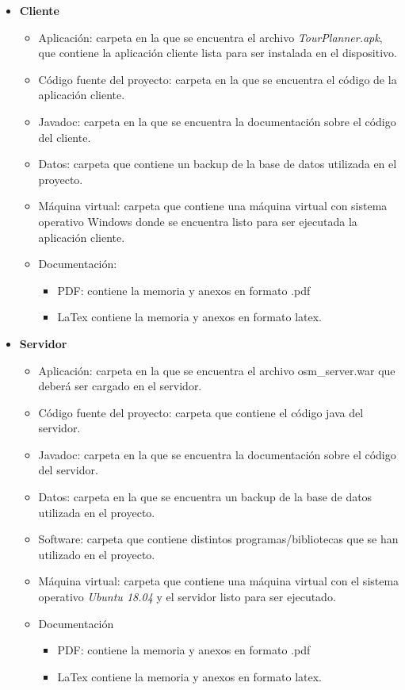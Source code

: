 \begin{itemize}
\item \textbf{Cliente}
\begin{itemize}
\item Aplicación: carpeta en la que se encuentra el archivo \textit{TourPlanner.apk}, que contiene la aplicación cliente lista para ser instalada en el dispositivo.
\item Código fuente del proyecto: carpeta en la que se encuentra el código de la aplicación cliente.
\item Javadoc: carpeta en la que se encuentra la documentación sobre el código del cliente.
\item Datos: carpeta que contiene un backup de la base de datos utilizada en el proyecto.
\item Máquina virtual: carpeta que contiene una máquina virtual con sistema operativo Windows donde se encuentra listo para ser ejecutada la aplicación cliente.
\item Documentación: 
\begin{itemize}
\item PDF: contiene la memoria y anexos en formato .pdf
\item LaTex contiene la memoria y anexos en formato latex.
\end{itemize}
\end{itemize}
\item \textbf{Servidor}
\begin{itemize}
\item Aplicación: carpeta en la que se encuentra el archivo osm\_server.war que deberá ser cargado en el servidor.
\item Código fuente del proyecto: carpeta que contiene el código java del servidor.
\item Javadoc: carpeta en la que se encuentra la documentación sobre el código del servidor.
\item Datos: carpeta en la que se encuentra un backup de la base de datos utilizada en el proyecto.
\item Software: carpeta que contiene distintos programas/bibliotecas que se han utilizado en el proyecto.
\item Máquina virtual: carpeta que contiene una máquina virtual con el sistema operativo \textit{Ubuntu 18.04} y el servidor listo para ser ejecutado.
\item Documentación
\begin{itemize}
\item PDF: contiene la memoria y anexos en formato .pdf
\item LaTex contiene la memoria y anexos en formato latex.
\end{itemize}
\end{itemize}
\end{itemize}
